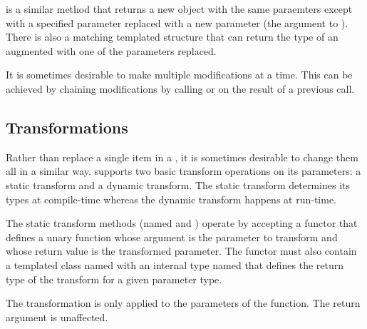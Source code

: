 
 is a similar method that returns a new
 object with the same paraemters except
with a specified parameter replaced with a new parameter (the argument to
). There is also a matching 
templated structure that can return the type of an augmented
 with one of the parameters replaced.



It is sometimes desirable to make multiple modifications at a time. This
can be achieved by chaining modifications by calling  or
 on the result of a previous call.


\subsection{Transformations}

Rather than replace a single item in a ,
it is sometimes desirable to change them all in a similar
way.  supports two basic transform
operations on its parameters: a static transform and a dynamic
transform. The static transform determines its types at compile-time
whereas the dynamic transform happens at run-time.


The static transform methods (named  and
) operate by accepting a functor that defines
a unary function whose argument is the 
parameter to transform and whose return value is the transformed
parameter. The functor must also contain a templated class named
 with an internal type named  that
defines the return type of the transform for a given parameter type.

The transformation is only applied to the parameters of the function. The
return argument is unaffected.

